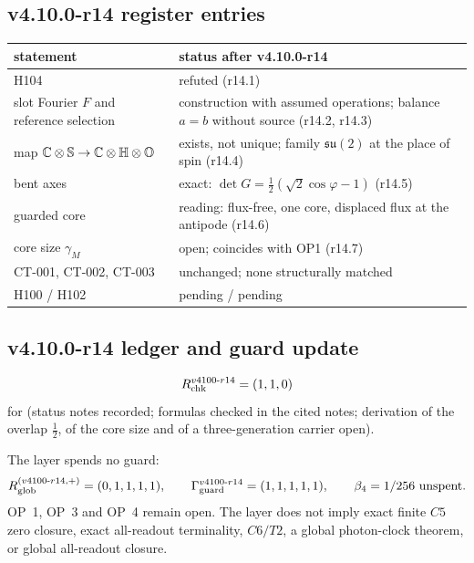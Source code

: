 \subsection*{v4.10.0-r14 register entries}
\label{subsec:v4100-r14-register}

\begin{center}
\small
\begin{tabular}{@{}>{\raggedright\arraybackslash}p{}>{\raggedright\arraybackslash}p{}@{}}
\toprule
statement & status after v4.10.0-r14\\
\midrule
H104 & refuted (r14.1)\\
slot Fourier \(F\) and reference selection & construction with assumed operations; balance \(a=b\) without source (r14.2, r14.3)\\
map \(\mathbb C\otimes\mathbb S\to\mathbb C\otimes\mathbb H\otimes\mathbb{O}\) & exists, not unique; family \(\mathfrak{su}(2)\) at the place of spin (r14.4)\\
bent axes & exact: \(\det G=\tfrac12(\sqrt2\cos\varphi-1)\) (r14.5)\\
guarded core & reading: flux-free, one core, displaced flux at the antipode (r14.6)\\
core size \(\gamma_M\) & open; coincides with OP1 (r14.7)\\
CT-001, CT-002, CT-003 & unchanged; none structurally matched\\
H100 / H102 & pending / pending\\
\bottomrule
\end{tabular}
\end{center}

\subsection*{v4.10.0-r14 ledger and guard update}
\label{subsec:v4100-r14-ledger-guard}

\[
R_{\rm chk}^{v4100\text{-}r14}=(1,1,0)
\]
for (status notes recorded; formulas checked in the cited notes; derivation of the overlap \(\tfrac12\), of the core size and
of a three-generation carrier open).

The layer spends no guard:
\[
R_{\rm glob}^{(v4100\text{-}r14,+)}=(0,1,1,1,1),
\qquad
\Gamma_{\rm guard}^{v4100\text{-}r14}=(1,1,1,1,1),
\qquad
\beta_4=1/256\ \text{unspent}.
\]
OP~1, OP~3 and OP~4 remain open.  The layer does not imply exact finite \(C5\) zero closure, exact all-readout terminality,
\(C6/T2\), a global photon-clock theorem, or global all-readout closure.

